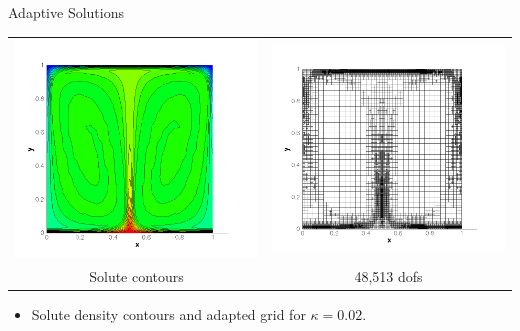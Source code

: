\documentclass[compress,12pt]{beamer}
\begin{document}
\begin{frame}{Adaptive Solutions}
  {
  \begin{center}
      \begin{tabular}{cc} \\
	\includegraphics[width=.5\textwidth]{figures/s_adapt_kappa_0_02}&
	\includegraphics[width=.5\textwidth]{figures/grid_adapt_kappa_0_02}\\
	Solute contours &
	48,513 dofs
      \end{tabular}\end{center}
      \begin{itemize}
 	
      \item Solute density contours and adapted grid for $\kappa=0.02$.
      \end{itemize}
  }


\end{frame}
\end{document}

